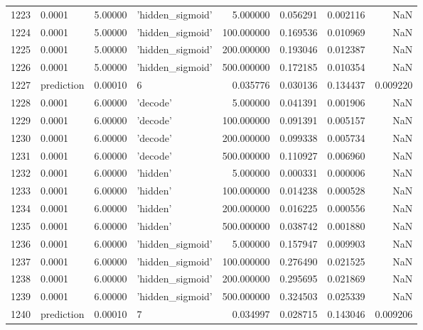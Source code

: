 \documentclass[10pt,a4paper]{article}
\begin{document}
\begin{tabular}{llrlrrrr}
1223 &      0.0001 &   5.00000 &   'hidden\_sigmoid' &    5.000000 &  0.056291 &  0.002116 &       NaN \\
1224 &      0.0001 &   5.00000 &   'hidden\_sigmoid' &  100.000000 &  0.169536 &  0.010969 &       NaN \\
1225 &      0.0001 &   5.00000 &   'hidden\_sigmoid' &  200.000000 &  0.193046 &  0.012387 &       NaN \\
1226 &      0.0001 &   5.00000 &   'hidden\_sigmoid' &  500.000000 &  0.172185 &  0.010354 &       NaN \\
1227 &  prediction &   0.00010 &                  6 &    0.035776 &  0.030136 &  0.134437 &  0.009220 \\
1228 &      0.0001 &   6.00000 &           'decode' &    5.000000 &  0.041391 &  0.001906 &       NaN \\
1229 &      0.0001 &   6.00000 &           'decode' &  100.000000 &  0.091391 &  0.005157 &       NaN \\
1230 &      0.0001 &   6.00000 &           'decode' &  200.000000 &  0.099338 &  0.005734 &       NaN \\
1231 &      0.0001 &   6.00000 &           'decode' &  500.000000 &  0.110927 &  0.006960 &       NaN \\
1232 &      0.0001 &   6.00000 &           'hidden' &    5.000000 &  0.000331 &  0.000006 &       NaN \\
1233 &      0.0001 &   6.00000 &           'hidden' &  100.000000 &  0.014238 &  0.000528 &       NaN \\
1234 &      0.0001 &   6.00000 &           'hidden' &  200.000000 &  0.016225 &  0.000556 &       NaN \\
1235 &      0.0001 &   6.00000 &           'hidden' &  500.000000 &  0.038742 &  0.001880 &       NaN \\
1236 &      0.0001 &   6.00000 &   'hidden\_sigmoid' &    5.000000 &  0.157947 &  0.009903 &       NaN \\
1237 &      0.0001 &   6.00000 &   'hidden\_sigmoid' &  100.000000 &  0.276490 &  0.021525 &       NaN \\
1238 &      0.0001 &   6.00000 &   'hidden\_sigmoid' &  200.000000 &  0.295695 &  0.021869 &       NaN \\
1239 &      0.0001 &   6.00000 &   'hidden\_sigmoid' &  500.000000 &  0.324503 &  0.025339 &       NaN \\
1240 &  prediction &   0.00010 &                  7 &    0.034997 &  0.028715 &  0.143046 &  0.009206 \\

\end{tabular}
\end{document}
